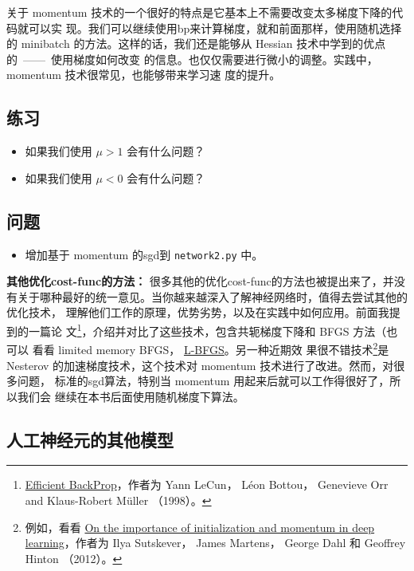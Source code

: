 关于 momentum 技术的一个很好的特点是它基本上不需要改变太多梯度下降的代码就可以实
现。我们可以继续使用\gls*{bp}来计算梯度，就和前面那样，使用随机选择的 minibatch
的方法。这样的话，我们还是能够从 Hessian 技术中学到的优点的~——~使用梯度如何改变
的信息。也仅仅需要进行微小的调整。实践中，momentum 技术很常见，也能够带来学习速
度的提升。

\subsection*{练习}

\begin{itemize}
\item 如果我们使用 $\mu > 1$ 会有什么问题？
\item 如果我们使用 $\mu < 0$ 会有什么问题？
\end{itemize}

\subsection*{问题}

\begin{itemize}
\item 增加基于 momentum 的\gls*{sgd}到 \lstinline!network2.py! 中。
\end{itemize}

\textbf{其他优化\gls*{cost-func}的方法：} 很多其他的优化\gls*{cost-func}的方法也被提出来了，并没
有关于哪种最好的统一意见。当你越来越深入了解神经网络时，值得去尝试其他的优化技术，
理解他们工作的原理，优势劣势，以及在实践中如何应用。前面我提到的一篇论
文\footnote{\href{http://yann.lecun.com/exdb/publis/pdf/lecun-98b.pdf}{Efficient
    BackProp}，作者为 Yann LeCun， Léon Bottou， Genevieve Orr and Klaus-Robert
  Müller （1998）。}，介绍并对比了这些技术，包含共轭梯度下降和 BFGS 方法（也可以
  看看 limited memory BFGS，
  \href{http://en.wikipedia.org/wiki/Limited-memory_BFGS}{L-BFGS}。另一种近期效
  果很不错技术\footnote{例如，看看
    \href{http://www.cs.toronto.edu/~hinton/absps/momentum.pdf}{On the
      importance of initialization and momentum in deep learning}，作者为 Ilya
    Sutskever， James Martens， George Dahl 和 Geoffrey Hinton （2012）。}是
  Nesterov 的加速梯度技术，这个技术对 momentum 技术进行了改进。然而，对很多问题，
  标准的\gls*{sgd}算法，特别当 momentum 用起来后就可以工作得很好了，所以我们会
  继续在本书后面使用随机梯度下算法。

\subsection{人工神经元的其他模型}
\label{subsec:other_models_of_artificial_neuron}
\label{sec:other_models_of_artificial_neuron}

